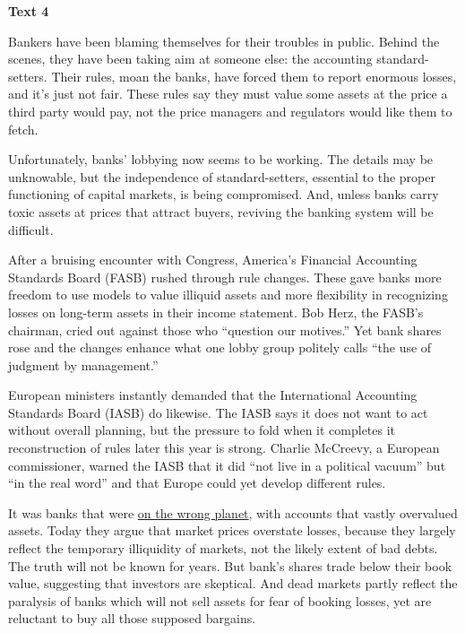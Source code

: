 
\begin{center}\textbf{Text 4}\end{center}

\qquad Bankers have been blaming themselves for their troubles in public. Behind the scenes, they have been taking aim at someone else: the accounting standard-setters. Their rules, moan the banks, have forced them to report enormous losses, and it's just not fair. These rules say they must value some assets at the price a third party would pay, not the price managers and regulators would like them to fetch.

\qquad Unfortunately, banks' lobbying now seems to be working. The details may be unknowable, but the independence of standard-setters, essential to the proper functioning of capital markets, is being compromised. And, unless banks carry toxic assets at prices that attract buyers, reviving the banking system will be difficult.

\qquad After a bruising encounter with Congress, America's Financial Accounting Standards Board (FASB) rushed through rule changes. These gave banks more freedom to use models to value illiquid assets and more flexibility in recognizing losses on long-term assets in their income statement. Bob Herz, the FASB's chairman, cried out against those who ``question our motives.'' Yet bank shares rose and the changes enhance what one lobby group politely calls ``the use of judgment by management.''

\qquad European ministers instantly demanded that the International Accounting Standards Board (IASB) do likewise. The IASB says it does not want to act without overall planning, but the pressure to fold when it completes it reconstruction of rules later this year is strong. Charlie McCreevy, a European commissioner, warned the IASB that it did ``not live in a political vacuum'' but ``in the real word'' and that Europe could yet develop different rules.

\qquad It was banks that were \ul{on the wrong planet}, with accounts that vastly overvalued assets. Today they argue that market prices overstate losses, because they largely reflect the temporary illiquidity of markets, not the likely extent of bad debts. The truth will not be known for years. But bank's shares trade below their book value, suggesting that investors are skeptical. And dead markets partly reflect the paralysis of banks which will not sell assets for fear of booking losses, yet are reluctant to buy all those supposed bargains.

